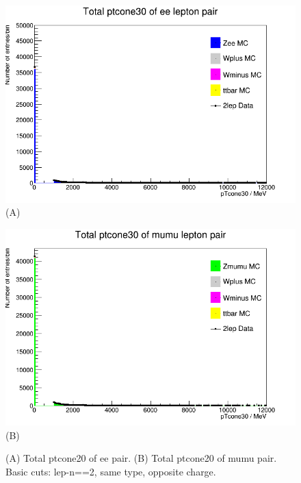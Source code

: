 \begin{figure}[h!]
    \centering
    \begin{minipage}{0.5\textwidth}
        \centering
        \includegraphics[width=\linewidth]{plots/25-02-2021/Zee-stack_total-ptcone30_(min-cuts_2lep=ee)_25_02_21_10-30_10-36.png}
        (A)
    \end{minipage}\hfill
    \begin{minipage}{0.5\textwidth}
        \centering
        \includegraphics[width=\linewidth]{plots/25-02-2021/Zmumu-stack_total-ptcone30_(min-cuts_2lep=mumu)_25_02_21_10-30).png}
        (B)
    \end{minipage}
    \caption{(A) Total ptcone20 of ee pair. (B) Total ptcone20 of mumu pair.  Basic cuts: lep-n==2, same type, opposite charge.}
    \label{fig:Zll-stack_total-ptcone30_(min-cuts_2lep=ll)_25_02_21}
\end{figure}

